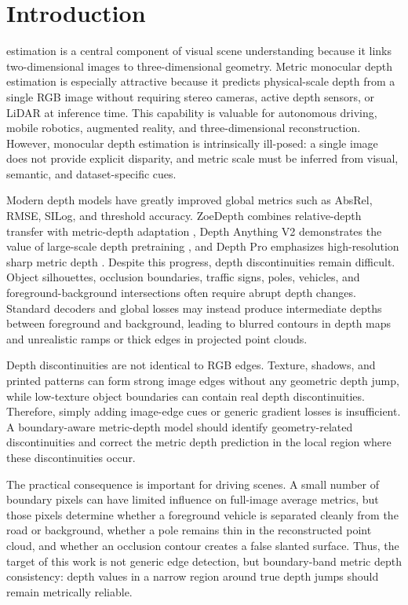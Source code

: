 \documentclass{ieeeaccess}
\begin{document}
\titlepgskip=-21pt

\maketitle

\section{Introduction}
\label{sec:introduction}
 estimation is a central component of visual scene understanding because it links two-dimensional images to three-dimensional geometry. Metric monocular depth estimation is especially attractive because it predicts physical-scale depth from a single RGB image without requiring stereo cameras, active depth sensors, or LiDAR at inference time. This capability is valuable for autonomous driving, mobile robotics, augmented reality, and three-dimensional reconstruction. However, monocular depth estimation is intrinsically ill-posed: a single image does not provide explicit disparity, and metric scale must be inferred from visual, semantic, and dataset-specific cues.

Modern depth models have greatly improved global metrics such as AbsRel, RMSE, SILog, and threshold accuracy. ZoeDepth combines relative-depth transfer with metric-depth adaptation \cite{zoedepth}, Depth Anything V2 demonstrates the value of large-scale depth pretraining \cite{dav2}, and Depth Pro emphasizes high-resolution sharp metric depth \cite{depthpro}. Despite this progress, depth discontinuities remain difficult. Object silhouettes, occlusion boundaries, traffic signs, poles, vehicles, and foreground-background intersections often require abrupt depth changes. Standard decoders and global losses may instead produce intermediate depths between foreground and background, leading to blurred contours in depth maps and unrealistic ramps or thick edges in projected point clouds.

Depth discontinuities are not identical to RGB edges. Texture, shadows, and printed patterns can form strong image edges without any geometric depth jump, while low-texture object boundaries can contain real depth discontinuities. Therefore, simply adding image-edge cues or generic gradient losses is insufficient. A boundary-aware metric-depth model should identify geometry-related discontinuities and correct the metric depth prediction in the local region where these discontinuities occur.

The practical consequence is important for driving scenes. A small number of boundary pixels can have limited influence on full-image average metrics, but those pixels determine whether a foreground vehicle is separated cleanly from the road or background, whether a pole remains thin in the reconstructed point cloud, and whether an occlusion contour creates a false slanted surface. Thus, the target of this work is not generic edge detection, but boundary-band metric depth consistency: depth values in a narrow region around true depth jumps should remain metrically reliable.
\end{document}
